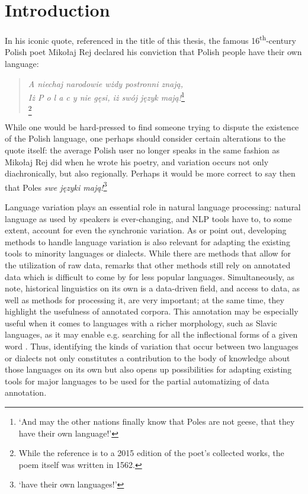\section{Introduction}
\label{sec:intro}

In his iconic quote, referenced in the title of this thesis, the famous 16\textsuperscript{th}-century Polish poet Mikołaj Rej declared his conviction that Polish people have their own language: 

\begin{quote}
\centering
   \textit{A niechaj narodowie wżdy postronni znają, \\
    Iż P o l a c y nie gęsi, iż swój język mają!}\footnote{ `And may the other nations finally know that Poles are not geese, that they have their own language!'} \\
\raggedleft
\citet{mikołaj_rej}\footnote{While the reference is to a 2015 edition of the poet's collected works, the poem itself was written in 1562.}
\end{quote}

While one would be hard-pressed to find someone trying to dispute the existence of the Polish language, one perhaps should consider certain alterations to the quote itself: the average Polish user no longer speaks in the same fashion as Mikołaj Rej did when he wrote his poetry, and variation occurs not only diachronically, but also regionally. Perhaps it would be more correct to say then that Poles \textit{swe języki mają!}\footnote{ `have their own languages!'}

Language variation plays an essential role in natural language processing: natural language as used by speakers is ever-changing, and NLP tools have to, to some extent, account for even the synchronic variation. As \citet{Zampieri2020NaturalLP} or \citet{dorn-2019-dialect} point out, developing methods to handle language variation is also relevant for adapting the existing tools to minority languages or dialects. While there are methods that allow for the utilization of raw data, \citet{ponti_2019} remarks that other methods still rely on annotated data which is difficult to come by for less popular languages. Simultaneously, as \citet{quantitative-historical} note, historical linguistics on its own is a data-driven field, and access to data, as well as methods for processing it, are very important; at the same time, they highlight the usefulness of annotated corpora. This annotation may be especially useful when it comes to languages with a richer morphology, such as Slavic languages, as it may enable e.g. searching for all the inflectional forms of a given word \citep{pęzik_2012}. Thus, identifying the kinds of variation that occur between two languages or dialects not only constitutes a contribution to the body of knowledge about those languages on its own but also opens up possibilities for adapting existing tools for major languages to be used for the partial automatizing of data annotation. 

